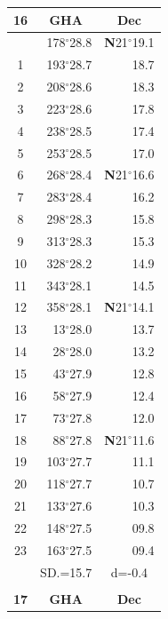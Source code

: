 \documentclass[10pt, a4paper]{report}
\begin{document}
\begin{scriptsize}
\noindent
\begin{tabular*}{0.2\textwidth}[t]{@{\extracolsep{\fill}}|c|rr|}
\hline
\multicolumn{1}{|c|}{\rule{0pt}{2.6ex}\textbf{16}} & \multicolumn{1}{c}{\textbf{GHA}} & \multicolumn{1}{c|}{\textbf{Dec}}\\
\hline\rule{0pt}{2.6ex}\noindent
0 & 178$^\circ$28.8 & \textbf{N}21$^\circ$19.1\\
1 & 193$^\circ$28.7 & 18.7\\
2 & 208$^\circ$28.6 & 18.3\\
3 & 223$^\circ$28.6 & \raisebox{0.24ex}{\boldmath$\cdot$~\boldmath$\cdot$~~}17.8\\
4 & 238$^\circ$28.5 & 17.4\\
5 & 253$^\circ$28.5 & 17.0\\[2Pt]
6 & 268$^\circ$28.4 & \textbf{N}21$^\circ$16.6\\
7 & 283$^\circ$28.4 & 16.2\\
8 & 298$^\circ$28.3 & 15.8\\
9 & 313$^\circ$28.3 & \raisebox{0.24ex}{\boldmath$\cdot$~\boldmath$\cdot$~~}15.3\\
10 & 328$^\circ$28.2 & 14.9\\
11 & 343$^\circ$28.1 & 14.5\\[2Pt]
12 & 358$^\circ$28.1 & \textbf{N}21$^\circ$14.1\\
13 & 13$^\circ$28.0 & 13.7\\
14 & 28$^\circ$28.0 & 13.2\\
15 & 43$^\circ$27.9 & \raisebox{0.24ex}{\boldmath$\cdot$~\boldmath$\cdot$~~}12.8\\
16 & 58$^\circ$27.9 & 12.4\\
17 & 73$^\circ$27.8 & 12.0\\[2Pt]
18 & 88$^\circ$27.8 & \textbf{N}21$^\circ$11.6\\
19 & 103$^\circ$27.7 & 11.1\\
20 & 118$^\circ$27.7 & 10.7\\
21 & 133$^\circ$27.6 & \raisebox{0.24ex}{\boldmath$\cdot$~\boldmath$\cdot$~~}10.3\\
22 & 148$^\circ$27.5 & 09.8\\
23 & 163$^\circ$27.5 & 09.4\\
\hline
\rule{0pt}{2.4ex} & \multicolumn{1}{c}{SD.=15.7} & \multicolumn{1}{c|}{d=-0.4}\\
\hline
\multicolumn{1}{c}{}\\[-0.5ex]\hline
\multicolumn{1}{|c|}{\rule{0pt}{2.6ex}\textbf{17}} & \multicolumn{1}{c}{\textbf{GHA}} & \multicolumn{1}{c|}{\textbf{Dec}}\\

\end{tabular*}
\end{scriptsize}
\end{document}
